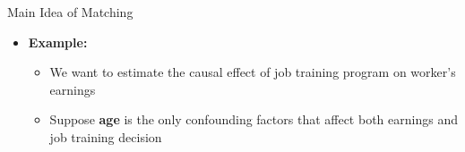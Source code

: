 \documentclass[hyperref={pdfpagelabels=false}]{beamer}
\begin{document}
\begin{frame}{Main Idea of Matching}
	\begin{itemize}
		
		\item \textbf{Example:} 
				\vspace{0.2cm}
			\begin{itemize}
		\item We want to estimate the causal effect of job training program on worker's earnings
		\vspace{0.2cm}

		\item Suppose \textbf{age} is the only confounding factors that affect both earnings and job training decision
					\end{itemize}
	\end{itemize}
\end{frame}
\end{document}

